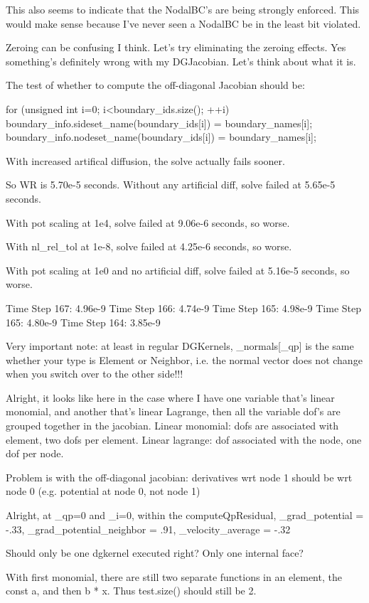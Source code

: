 {This also seems to indicate that the NodalBC's are being strongly enforced. This would make sense because I've never seen a NodalBC be in the least bit violated.

Zeroing can be confusing I think. Let's try eliminating the zeroing effects. Yes something's definitely wrong with my DGJacobian. Let's think about what it is.

The test of whether to compute the off-diagonal Jacobian should be:

  for (unsigned int i=0; i<boundary_ids.size(); ++i) {
    boundary_info.sideset_name(boundary_ids[i]) = boundary_names[i];
    boundary_info.nodeset_name(boundary_ids[i]) = boundary_names[i];
  }

With increased artifical diffusion, the solve actually fails sooner.

So WR is 5.70e-5 seconds. Without any artificial diff, solve failed at 5.65e-5 seconds.

With pot scaling at 1e4, solve failed at 9.06e-6 seconds, so worse.

With nl_rel_tol at 1e-8, solve failed at 4.25e-6 seconds, so worse.

With pot scaling at 1e0 and no artificial diff, solve failed at 5.16e-5 seconds, so worse.

Time Step 167: 4.96e-9
Time Step 166: 4.74e-9
Time Step 165: 4.98e-9
Time Step 165: 4.80e-9
Time Step 164: 3.85e-9

Very important note: at least in regular DGKernels, _normals[_qp] is the same whether your type is Element or Neighbor, i.e. the normal vector does not change when you switch over to the other side!!!

Alright, it looks like here in the case where I have one variable that's linear monomial, and another that's linear Lagrange, then all the variable dof's are grouped together in the jacobian. Linear monomial: dofs are associated with element, two dofs per element. Linear lagrange: dof associated with the node, one dof per node.

Problem is with the off-diagonal jacobian: derivatives wrt node 1 should be wrt node 0 (e.g. potential at node 0, not node 1)

Alright, at _qp=0 and _i=0, within the computeQpResidual, _grad_potential = -.33, _grad_potential_neighbor = .91, _velocity_average = -.32

Should only be one dgkernel executed right? Only one internal face?

With first monomial, there are still two separate functions in an element, the const a, and then b * x. Thus test.size() should still be 2.

}
